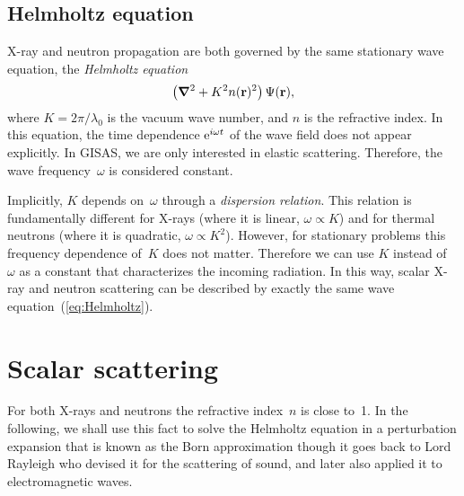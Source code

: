 
\subsection{Helmholtz equation}

X-ray and neutron propagation are both governed by
the same stationary wave equation,
the \textit{Helmholtz equation}
\begin{equation}\label{eq:Helmholtz}
  \left(\bm{\nabla}^2+K^2n(\mathbf{r})^2\right)\Psi(\mathbf{r}),
\end{equation}
where $K=2\pi/\lambda_0$ is the vacuum wave number,
and $n$ is the refractive index.
In this equation,
the time dependence ${\rm e}^{i\omega t}$ of the wave field
does not appear explicitly.
In GISAS, we are only interested in elastic scattering.
Therefore, the wave frequency~$\omega$ is considered constant.

Implicitly, $K$ depends on~$\omega$ through a \textit{dispersion relation}.
This relation is fundamentally different for
X-rays (where it is linear, $\omega\propto K$)
and for thermal neutrons (where it is quadratic, $\omega\propto K^2$).
However, for stationary problems
this frequency dependence of~$K$ does not matter.
Therefore we can use $K$ instead of~$\omega$ as a constant
that characterizes the incoming radiation.
In this way, scalar X-ray and neutron scattering can be described by exactly
the same wave equation~(\ref{eq:Helmholtz}).



\section{Scalar scattering}

For both X-rays and neutrons the refractive index~$n$ is close to~1.
In the following,
we shall use this fact to solve the Helmholtz equation 
in a perturbation expansion
that is known as the Born approximation
though it goes back to Lord Rayleigh
who devised it for the scattering of sound,
and later also applied it to electromagnetic waves.

